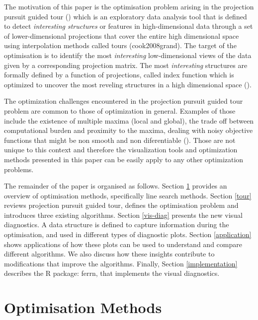 The motivation of this paper is the optimisation problem arising in the projection pursuit guided tour (\citet{buja2005computational}) which is an exploratory data analysis tool that is defined to detect \emph{interesting structures} or features in high-dimensional data through a set of lower-dimensional projections that cover the entire high dimensional space using interpolation methods called tours (cook2008grand). The target of the optimisation is to identify the most \emph{interesting} low-dimensional views of the data given by a corresponding projection matrix. The most \emph{interesting} structures are formally defined by a function of projections, called index function which is optimized to uncover the most reveling structures in a high dimensional space (\citet{cook1993projection}).

The optimization challenges encountered in the projection pursuit guided tour problem are common to those of optimization in general. Examples of those include the existence of multiple maxima (local and global), the trade off between computational burden and proximity to the maxima, dealing with noisy objective functions that might be non smooth and non diferentiable (\citet{jones1998efficient}). Those are not unique to this context and therefore the visualization tools and optimization methods presented in this paper can be easily apply to any other optimization problems.

The remainder of the paper is organised as follows.
Section \ref{optim} provides an overview of optimisation methods, specifically line search methods.
Section \ref{tour} reviews projection pursuit guided tour, defines the optimisation problem and introduces three existing algorithms.
Section \ref{vis-diag} presents the new visual diagnostics. A data structure is defined to capture information during the optimisation, and used in different types of diagnostic plots.
Section \ref{application} shows applications of how these plots can be used to understand and compare different algorithms. We also discuss how these insights contribute to modifications that improve the algorithms.
Finally, Section \ref{implementation} describes the R package: ferrn, that implements the visual diagnostics.

\hypertarget{optim}{%
\section{Optimisation Methods}\label{optim}}

